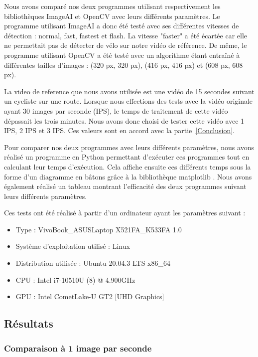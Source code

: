 Nous avons comparé nos deux programmes utilisant respectivement les bibliothèques ImageAI et OpenCV avec leurs différents paramètres.
Le programme utilisant ImageAI a donc été testé avec ses différentes vitesses de détection : normal, fast, fastest et flash.
La vitesse "faster" a été écartée car elle ne permettait pas de détecter de vélo sur notre vidéo de référence.
De même, le programme utilisant OpenCV a été testé avec un algorithme étant entraîné à différentes tailles d'images :
(320 px, 320 px), (416 px, 416 px) et (608 px, 608 px).

La \gls{video de reference} que nous avons utilisée est une vidéo de 15 secondes suivant un cycliste sur une route.
Lorsque nous effections des tests avec la vidéo originale ayant 30 images par seconde (IPS),
le temps de traitement de cette vidéo dépassait les trois minutes.
Nous avons donc choisi de tester cette vidéo avec 1 IPS, 2 IPS et 3 IPS.
Ces valeurs sont en accord avec la partie~\ref{Conclusion}.

Pour comparer nos deux programmes avec leurs différents paramètres, nous avons réalisé un programme en Python permettant
d'exécuter ces programmes tout en calculant leur temps d'exécution.
Cela affiche ensuite ces différents temps sous la forme d'un diagramme en bâtons grâce à la bibliothèque matplotlib \cite{matplotlib}.
Nous avons également réalisé un tableau montrant l'efficacité des deux programmes suivant leurs différents paramètres.

Ces tests ont été réalisé à partir d'un ordinateur ayant les paramètres suivant :
\begin{itemize}
    \item Type : VivoBook\_ASUSLaptop X521FA\_K533FA 1.0
    \item Système d'exploitation utilisé : Linux
    \item Distribution utilisée : Ubuntu 20.04.3 LTS x86\_64
    \item \gls{CPU} : Intel i7-10510U (8) @ 4.900GHz
    \item \gls{GPU} : Intel CometLake-U GT2 [UHD Graphics]
\end{itemize}

\subsection{Résultats}
\label{sec:comparaisonIA:resultats}

\subsubsection{Comparaison à 1 image par seconde}
\label{sec:comparaisonIA:resultats:1fps}


